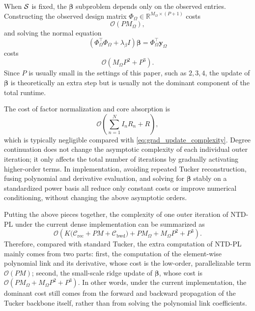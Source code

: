 When $\mathcal{S}$ is fixed, the $\boldsymbol\beta$ subproblem depends only on the observed entries. Constructing the observed design matrix $\Phi_\Omega\in\mathbb R^{M_\Omega\times(P+1)}$ costs
\begin{equation}
\mathcal O(PM_\Omega),
\end{equation}
and solving the normal equation
\begin{equation}
(\Phi_\Omega^\top\Phi_\Omega+\lambda_\beta I)\boldsymbol\beta
=
\Phi_\Omega^\top\mathbf y_\Omega
\end{equation}
costs
\begin{equation}
\mathcal O(M_\Omega P^2 + P^3).
\label{eq:beta_update_complexity}
\end{equation}
Since $P$ is usually small in the settings of this paper, such as $2,3,4$, the update of $\boldsymbol\beta$ is theoretically an extra step but is usually not the dominant component of the total runtime.

The cost of factor normalization and core absorption is
\begin{equation}
\mathcal O\!\left(\sum_{n=1}^{N} I_nR_n + R\right),
\end{equation}
which is typically negligible compared with \eqref{eq:grad_update_complexity}. Degree continuation does not change the asymptotic complexity of each individual outer iteration; it only affects the total number of iterations by gradually activating higher-order terms. In implementation, avoiding repeated Tucker reconstruction, fusing polynomial and derivative evaluation, and solving for $\boldsymbol\beta$ stably on a standardized power basis all reduce only constant costs or improve numerical conditioning, without changing the above asymptotic orders.

Putting the above pieces together, the complexity of one outer iteration of NTD-PL under the current dense implementation can be summarized as
\begin{equation}
\mathcal O\!\left(
K\bigl(\mathcal C_{\mathrm{rec}} + PM + \mathcal C_{\mathrm{bwd}}\bigr)
+
PM_\Omega + M_\Omega P^2 + P^3
\right).
\label{eq:total_complexity_main}
\end{equation}
Therefore, compared with standard Tucker, the extra computation of NTD-PL mainly comes from two parts: first, the computation of the element-wise polynomial link and its derivative, whose cost is the low-order, parallelizable term $\mathcal O(PM)$; second, the small-scale ridge update of $\boldsymbol\beta$, whose cost is $\mathcal O(PM_\Omega + M_\Omega P^2 + P^3)$. In other words, under the current implementation, the dominant cost still comes from the forward and backward propagation of the Tucker backbone itself, rather than from solving the polynomial link coefficients.
